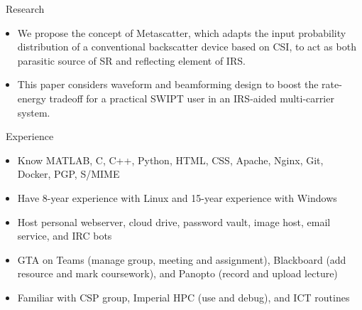 \documentclass{resume}
\begin{document}
\begin{section}{\faPaperPlane\ Research}
	\begin{itemize}
		\item We propose the concept of Metascatter, which adapts the input probability distribution of a conventional backscatter device based on CSI, to act as both parasitic source of SR and reflecting element of IRS.
	\end{itemize}
	\begin{itemize}
		\item This paper considers waveform and beamforming design to boost the rate-energy tradeoff for a practical SWIPT user in an IRS-aided multi-carrier system.
	\end{itemize}
\end{section}

\begin{section}{\faTasks\ Experience}
	\begin{itemize}[itemsep=0pt, topsep=5pt, parsep=3pt, partopsep=0pt]
		\item Know MATLAB, C, C++, Python, HTML, CSS, Apache, Nginx, Git, Docker, PGP, S/MIME
		\item Have 8-year experience with Linux and 15-year experience with Windows
		\item Host personal webserver, cloud drive, password vault, image host, email service, and IRC bots
		\item GTA on Teams (manage group, meeting and assignment), Blackboard (add resource and mark coursework), and Panopto (record and upload lecture)
		\item Familiar with CSP group, Imperial HPC (use and debug), and ICT routines
	\end{itemize}
\end{section}

\end{document}
